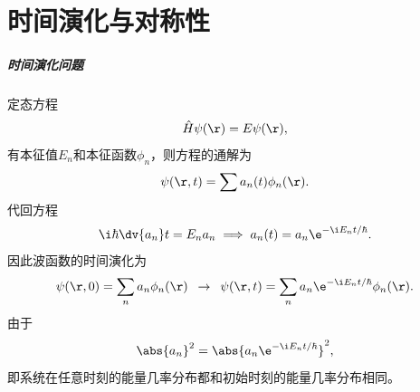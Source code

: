\chapter{时间演化与对称性}
\paragraph{时间演化问题}
定态\Schr 方程
\[
	\hat H\psi(\r)=E\psi(\r),
\]
有本征值$E_n$和本征函数$\phi_n$，则\Schr 方程的通解为
\[
	\psi(\r,t)=\sum a_n(t)\phi_n(\r).
\]
代回\Schr 方程
\[
	\i\hbar\dv{a_n}t=E_na_n\implies a_n(t)=a_n\e^{-\i E_nt/\hbar}.
\]
因此波函数的时间演化为
\[
	\psi(\r,0)=\sum_n a_n\phi_n(\r)\enspace\rightarrow\enspace\psi(\r,t)=\sum_n a_n\e^{-\i E_nt/\hbar}\phi_n(\r).
\]
由于
\[
	\abs{a_n}^2=\abs{a_n\e^{-\i E_nt/\hbar}}^2,
\]
即系统在任意时刻的能量几率分布都和初始时刻的能量几率分布相同。

